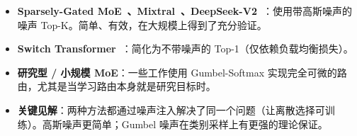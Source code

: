 \begin{keybox}[实际中使用的是哪种方法？]
\begin{itemize}
  \item \textbf{Sparsely-Gated MoE~\cite{shazeer2017outrageously}、Mixtral~\cite{jiang2024mixtral}、DeepSeek-V2~\cite{deepseekv2}}：使用带高斯噪声的噪声 Top-K。简单、有效，在大规模上得到了充分验证。
  \item \textbf{Switch Transformer~\cite{fedus2022switch}}：简化为不带噪声的 Top-1（仅依赖负载均衡损失）。
  \item \textbf{研究型 / 小规模 MoE}：一些工作使用 Gumbel-Softmax 实现完全可微的路由，尤其是当学习路由本身就是研究目标时。
  \item \textbf{关键见解}：两种方法都通过噪声注入解决了同一个问题（让离散选择可训练）。高斯噪声更简单；Gumbel 噪声在类别采样上有更强的理论保证。
\end{itemize}


\end{keybox}
